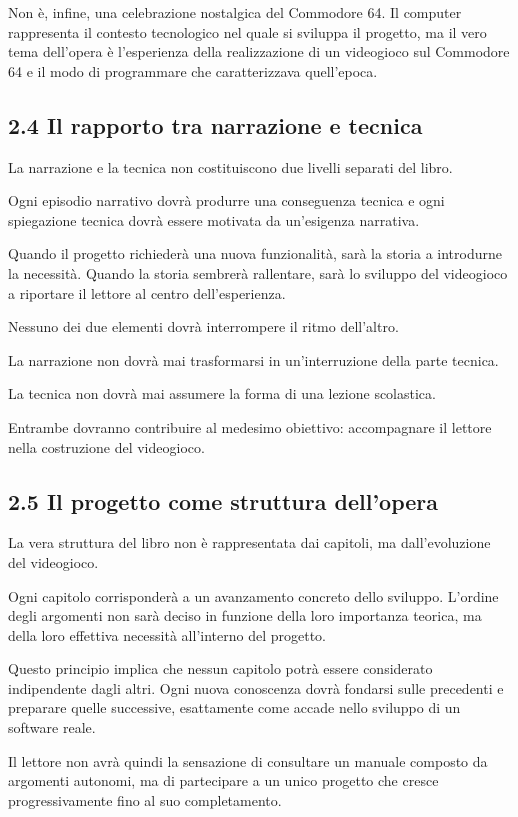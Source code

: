 \documentclass{article}
\begin{document}
Non è, infine, una celebrazione nostalgica del Commodore 64. Il computer rappresenta il contesto tecnologico nel quale
si sviluppa il progetto, ma il vero tema dell'opera è l'esperienza della realizzazione di un videogioco sul Commodore
64 e il modo di programmare che caratterizzava quell'epoca.

\subsection{2.4 Il rapporto tra narrazione e tecnica}
La narrazione e la tecnica non costituiscono due livelli separati del libro.

Ogni episodio narrativo dovrà produrre una conseguenza tecnica e ogni spiegazione tecnica dovrà essere motivata da
un'esigenza narrativa.

Quando il progetto richiederà una nuova funzionalità, sarà la storia a introdurne la necessità. Quando la storia
sembrerà rallentare, sarà lo sviluppo del videogioco a riportare il lettore al centro dell'esperienza.

Nessuno dei due elementi dovrà interrompere il ritmo dell'altro.

La narrazione non dovrà mai trasformarsi in un'interruzione della parte tecnica.

La tecnica non dovrà mai assumere la forma di una lezione scolastica.

Entrambe dovranno contribuire al medesimo obiettivo: accompagnare il lettore nella costruzione del videogioco.

\subsection[2.5 Il progetto come struttura dell{}'opera]{2.5 Il progetto come struttura dell'opera}
La vera struttura del libro non è rappresentata dai capitoli, ma dall'evoluzione del videogioco.

Ogni capitolo corrisponderà a un avanzamento concreto dello sviluppo. L'ordine degli argomenti non sarà deciso in
funzione della loro importanza teorica, ma della loro effettiva necessità all'interno del progetto.

Questo principio implica che nessun capitolo potrà essere considerato indipendente dagli altri. Ogni nuova conoscenza
dovrà fondarsi sulle precedenti e preparare quelle successive, esattamente come accade nello sviluppo di un software
reale.

Il lettore non avrà quindi la sensazione di consultare un manuale composto da argomenti autonomi, ma di partecipare a un
unico progetto che cresce progressivamente fino al suo completamento.
\end{document}
